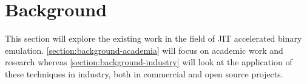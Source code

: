 \section{Background}

This section will explore the existing work in the field of JIT accelerated binary emulation. \autoref{section:background-academia} will focus on academic work and research whereas \autoref{section:background-industry} will look at the application of these techniques in industry, both in commercial and open source projects.


